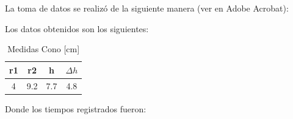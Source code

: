La toma de datos se realizó de la siguiente manera (ver en Adobe Acrobat):

\begin{center}
\end{center}

\newpage
Los datos obtenidos son los siguientes:

\begin{table}[H]
    \centering
    \caption{Medidas Cono [cm]}
    \begin{tabular}{|c|c|c|c|}
    \hline
    r1 & r2 & h & $\Delta h$ \\ \hline
    4 & 9.2 & 7.7 & 4.8 \\ \hline
    \end{tabular}
    \label{tab:permeabilidad}
\end{table}

Donde los tiempos registrados fueron:

